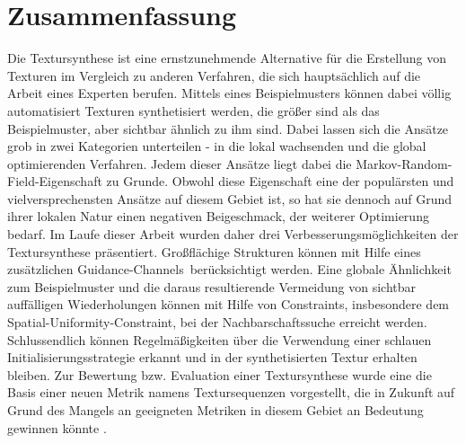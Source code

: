 \section{Zusammenfassung}

Die Textursynthese ist eine ernstzunehmende Alternative für die Erstellung von Texturen im Vergleich zu anderen Verfahren, die sich hauptsächlich auf die Arbeit eines Experten berufen.
Mittels eines Beispielmusters können dabei völlig automatisiert Texturen synthetisiert werden, die größer sind als das Beispielmuster, aber sichtbar ähnlich zu ihm sind.
Dabei lassen sich die Ansätze grob in zwei Kategorien unterteilen - in die lokal wachsenden und die global optimierenden Verfahren.
Jedem dieser Ansätze liegt dabei die \glqq Markov-Random-Field\grqq -Eigenschaft zu Grunde.
Obwohl diese Eigenschaft eine der populärsten und vielversprechensten Ansätze auf diesem Gebiet ist, so hat sie dennoch auf Grund ihrer lokalen Natur einen negativen Beigeschmack, der weiterer Optimierung bedarf.
Im Laufe dieser Arbeit wurden daher drei Verbesserungsmöglichkeiten der Textursynthese präsentiert.
Großflächige Strukturen können mit Hilfe eines zusätzlichen \glqq Guidance-Channels\grqq \ berücksichtigt werden.
Eine globale Ähnlichkeit zum Beispielmuster und die daraus resultierende Vermeidung von sichtbar auffälligen Wiederholungen können mit Hilfe von Constraints, insbesondere dem \glqq Spatial-Uniformity\grqq -Constraint, bei der Nachbarschaftssuche erreicht werden.
Schlussendlich können Regelmäßigkeiten über die Verwendung einer schlauen Initialisierungsstrategie erkannt und in der synthetisierten Textur erhalten bleiben.
Zur Bewertung bzw. Evaluation einer Textursynthese wurde eine die Basis einer neuen Metrik namens Textursequenzen vorgestellt, die in Zukunft auf Grund des Mangels an geeigneten Metriken in diesem Gebiet an Bedeutung gewinnen könnte \cite{SelfTuning}.
